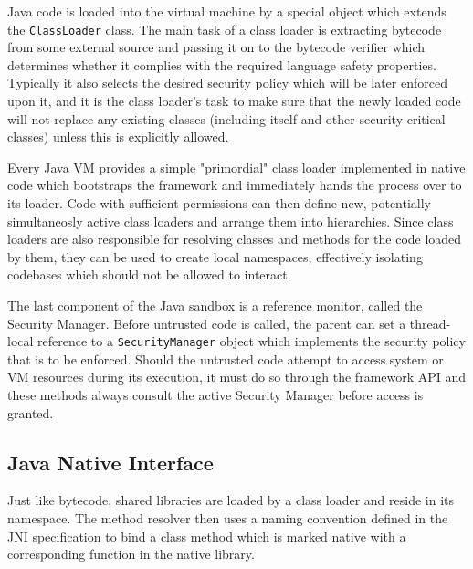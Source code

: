 \documentclass[a4paper,12pt,twoside,openright]{report}
\newcommand{\keyword}[1]{\textsf{#1}}
\newcommand{\class}[1]{\texttt{#1}}
\begin{document}
Java code is loaded into the virtual machine by a special object which extends the \class{ClassLoader} class. The main task of a class loader is extracting bytecode from some external source and passing it on to the bytecode verifier which determines whether it complies with the required language safety properties. Typically it also selects the desired security policy which will be later enforced upon it, and it is the class loader's task to make sure that the newly loaded code will not replace any existing classes (including itself and other security-critical classes) unless this is explicitly allowed. 

Every Java VM provides a simple "primordial" class loader implemented in native code which bootstraps the framework and immediately hands the process over to its loader. Code with sufficient permissions can then define new, potentially simultaneosly active class loaders and arrange them into hierarchies. Since class loaders are also responsible for resolving classes and methods for the code loaded by them, they can be used to create local namespaces, effectively isolating codebases which should not be allowed to interact.

The last component of the Java sandbox is a reference monitor, called the Security Manager. Before untrusted code is called, the parent can set a thread-local reference to a \class{SecurityManager} object which implements the security policy that is to be enforced. Should the untrusted code attempt to access system or VM resources during its execution, it must do so through the framework API and these methods always consult the active Security Manager before access is granted.

\subsection{Java Native Interface}

Just like bytecode, shared libraries are loaded by a class loader and reside in its namespace. The method resolver then uses a naming convention defined in the JNI specification to bind a class method which is marked \keyword{native} with a corresponding function in the native library.
\end{document}
